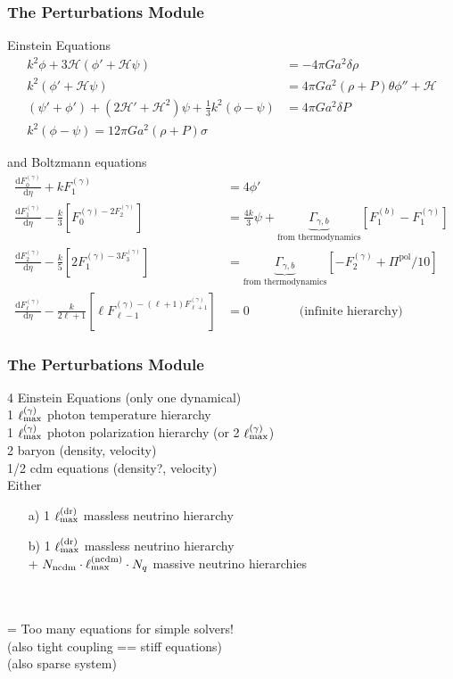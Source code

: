 \begin{frame}[fragile]
	\frametitle{The Perturbations Module}
	
	Einstein Equations
	\begin{align}
		k^2 \phi + 3\mathcal{H} (\phi'+\mathcal{H}\psi) &= -4\pi G a^2 \delta \rho\\
		k^2 (\phi'+\mathcal{H}\psi) &= 4\pi G a^2 (\rho+P) \theta
		\phi''+\mathcal{H}\\ (\psi'+\phi')+(2\mathcal{H}'+\mathcal{H}^2) \psi + \frac{1}{3}k^2 (\phi-\psi) &= 4\pi G a^2 \delta P\\
		k^2 (\phi-\psi) = 12\pi G a^2 (\rho+P) \sigma
	\end{align}
	
	and Boltzmann equations
	\begin{align}
		\frac{\mathrm{d}F_0^{(\gamma)}}{\mathrm{d}\eta} + k F_1^{(\gamma)} &= 4\phi'\\
		\frac{\mathrm{d}F_1^{(\gamma)}}{\mathrm{d}\eta} - \frac{k}{3} \left[F_0^{(\gamma) - 2 F_2^{(\gamma)}}\right] &= \frac{4 k}{3} \psi + \underbrace{\Gamma_{\gamma,b}}_\text{from thermodynamics} [F_1^{(b)}-F_1^{(\gamma)}]\\
		\frac{\mathrm{d}F_2^{(\gamma)}}{\mathrm{d}\eta} - \frac{k}{5} \left[2 F_1^{(\gamma) - 3 F_3^{(\gamma)}}\right] &= \underbrace{\Gamma_{\gamma,b}}_\text{from thermodynamics} [-F_2^{(\gamma)}+\Pi^\mathrm{pol}/10]\\
		\frac{\mathrm{d}F_\ell^{(\gamma)}}{\mathrm{d}\eta} - \frac{k}{2\ell+1} \left[\ell F_{\ell-1}^{(\gamma) - (\ell+1) F_{\ell+1}^{(\gamma)}}\right] &= 0 \qquad \qquad \text{(infinite hierarchy)}
	\end{align}
\end{frame}

\begin{frame}[fragile]
	\frametitle{The Perturbations Module}
	
	4 Einstein Equations (only one dynamical)\\
	1 $\ell^{(\gamma)}_{\rm max}$ photon temperature hierarchy \\
	1 $\ell^{(\gamma)}_{\rm max}$ photon polarization hierarchy (or 2 $\ell^{(\gamma)}_{\rm max}$) \\
	2 baryon (density, velocity) \\
	1/2 cdm equations (density?, velocity)\\
	Either
	\begin{itemize}
		\item[a)] 1 $\ell^{\mathrm{(dr)}}_{\rm max}$ massless neutrino hierarchy
		\item[b)] 1 $\ell^{\mathrm{(dr)}}_{\rm max}$ massless neutrino hierarchy \\+ $N_\mathrm{ncdm} \cdot \ell^{\mathrm{(ncdm)}}_{\rm max} \cdot N_q$ massive neutrino hierarchies
	\end{itemize}
	\mbox{}\\ \mbox{}\\
	= Too many equations for simple solvers!\\
	(also tight coupling == stiff equations)\\
	(also sparse system)
\end{frame}

